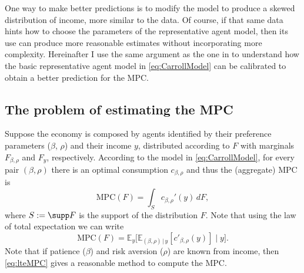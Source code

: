\documentclass[english, a4paper, 12pt]{article}
\begin{document}
\vfill
\newpage	
One way to make better predictions is to modify the model to produce a skewed distribution of income, more similar to the data. Of course, if that same data hints how to choose the parameters of the representative agent model, then its use can produce more reasonable estimates without incorporating more complexity. Hereinafter I use the same argument as the one in  to understand how the basic representative agent model in \eqref{eq:CarrollModel} can be calibrated to obtain a better prediction for the MPC.

\subsection{The problem of estimating the MPC}
Suppose the economy is composed by agents identified by their preference parameters ($\beta$, $\rho$) and their income $y$, distributed according to $F$ with marginals $F_{\beta, \rho}$ and $F_{y}$, respectively. According to the model in \eqref{eq:CarrollModel}, for every pair $(\beta,\rho)$ there is an optimal consumption $c_{\beta,\rho}$ and thus the (aggregate) MPC is 
	$$ \mathrm{MPC}(F) = \int_{S} c_{\beta,\rho}'(y) \, dF, $$
where $S := \supp F$ is the support of the distribution $F$. Note that using the law of total expectation we can write
	\begin{equation} \label{eq:lteMPC}
		\mathrm{MPC}(F) = \mathbb{E}_{y}\Big[ \mathbb{E}_{(\beta,\rho) \, | \, y}[c'_{\beta,\rho}(y)] \; \Big| \; y \Big].
	\end{equation}
Note that if patience ($\beta$) and risk aversion ($\rho$) are known from income, then \eqref{eq:lteMPC} gives a reasonable method to compute the MPC.
\end{document}
